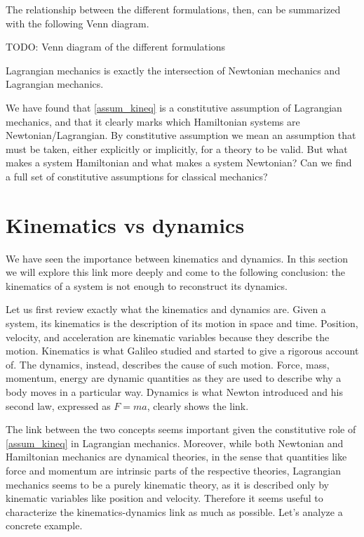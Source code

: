 The relationship between the different formulations, then, can be summarized with the following Venn diagram.

TODO: Venn diagram of the different formulations

Lagrangian mechanics is exactly the intersection of Newtonian mechanics and Lagrangian mechanics.

We have found that \ref{assum_kineq} is a constitutive assumption of Lagrangian mechanics, and that it clearly marks which Hamiltonian systems are Newtonian/Lagrangian. By constitutive assumption we mean an assumption that must be taken, either explicitly or implicitly, for a theory to be valid. But what makes a system Hamiltonian and what makes a system Newtonian? Can we find a full set of constitutive assumptions for classical mechanics?

\section{Kinematics vs dynamics}

We have seen the importance between kinematics and dynamics. In this section we will explore this link more deeply and come to the following conclusion: the kinematics of a system is not enough to reconstruct its dynamics. 

Let us first review exactly what the kinematics and dynamics are. Given a system, its kinematics is the description of its motion in space and time. Position, velocity, and acceleration are kinematic variables because they describe the motion. Kinematics is what Galileo studied and started to give a rigorous account of. The dynamics, instead, describes the cause of such motion. Force, mass, momentum, energy are dynamic quantities as they are used to describe why a body moves in a particular way. Dynamics is what Newton introduced and his second law, expressed as $F=ma$, clearly shows the link.

The link between the two concepts seems important given the constitutive role of \ref{assum_kineq} in Lagrangian mechanics. Moreover, while both Newtonian and Hamiltonian mechanics are dynamical theories, in the sense that quantities like force and momentum are intrinsic parts of the respective theories, Lagrangian mechanics seems to be a purely kinematic theory, as it is described only by kinematic variables like position and velocity. Therefore it seems useful to characterize the kinematics-dynamics link as much as possible. Let's analyze a concrete example.

